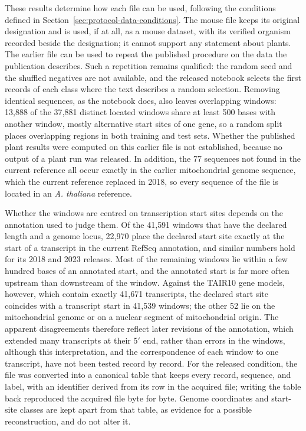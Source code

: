 These results determine how each file can be used, following the conditions
defined in Section~\ref{sec:protocol-data-conditions}. The mouse file keeps its
original designation and is used, if at all, as a mouse dataset, with its
verified organism recorded beside the designation; it cannot support any
statement about plants. The earlier file can be used to repeat the published
procedure on the data the publication describes. Such a repetition remains
qualified: the random seed and the shuffled negatives are not available, and
the released notebook selects the first records of each class where the text
describes a random selection. Removing identical sequences, as the notebook does,
also leaves overlapping windows: 13{,}888 of the 37{,}881 distinct located
windows share at least 500 bases with another window, mostly alternative start
sites of one gene, so a random split places overlapping regions in both
training and test sets. Whether the published plant results were
computed on this earlier file is not established, because no output of a plant
run was released. In addition, the 77 sequences not found in the current
reference all occur exactly in the earlier mitochondrial genome sequence, which
the current reference replaced in 2018, so every sequence of the file is
located in an \textit{A. thaliana} reference.

Whether the windows are centred on transcription start sites depends on the
annotation used to judge them. Of the 41{,}591 windows that have the declared
length and a genome locus, 22{,}970 place the declared start site exactly at
the start of a transcript in the current RefSeq annotation, and similar
numbers hold for its 2018 and 2023 releases. Most of the remaining windows lie
within a few hundred bases of an annotated start, and the annotated start is
far more often upstream than downstream of the window. Against the TAIR10 gene
models, however, which contain exactly 41{,}671 transcripts, the declared start
site coincides with a transcript start in 41{,}539 windows; the other 52 lie on
the mitochondrial genome or on a nuclear segment of mitochondrial origin. The
apparent disagreements therefore reflect later revisions of the annotation,
which extended many transcripts at their 5$'$ end, rather than errors in the
windows, although this interpretation, and the correspondence of each window
to one transcript, have not been tested record by record. For the released
condition, the file was converted into a canonical table that keeps every
record, sequence, and label, with an identifier derived from its row in the
acquired file; writing the table back reproduced the acquired file byte for
byte. Genome coordinates and start-site classes are kept apart from that table,
as evidence for a possible reconstruction, and do not alter it.

